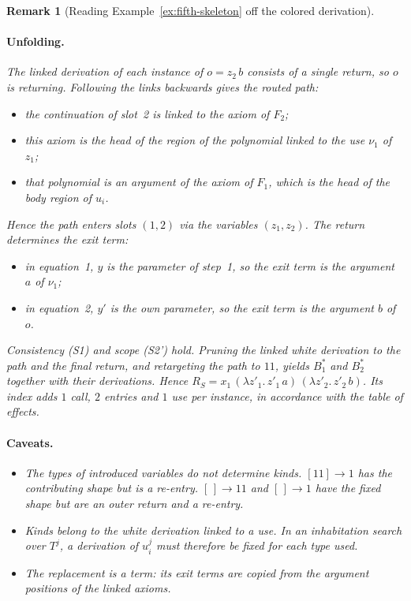 \documentclass[10pt,a4paper]{article}
\theoremstyle{plain}%
\newtheorem{remark}[theorem]{Remark}
\begin{document}
\begin{remark}[Reading Example~\ref{ex:fifth-skeleton} off the colored derivation]
\paragraph{Unfolding.}
The linked derivation of each instance of $o = z_2\,b$ consists of a single return, so $o$ is returning.
Following the links backwards gives the routed path:
\begin{itemize}
\item the continuation of slot~2 is linked to the axiom of $F_2$;
\item this axiom is the head of the region of the polynomial linked to the use $\nu_1$ of $z_1$;
\item that polynomial is an argument of the axiom of $F_1$, which is the head of the body region of $u_i$.
\end{itemize}
Hence the path enters slots $(1,2)$ via the variables $(z_1, z_2)$.
The return determines the exit term:
\begin{itemize}
\item in equation~1, $y$ is the parameter of step~1, so the exit term is the argument $a$ of $\nu_1$;
\item in equation~2, $y'$ is the own parameter, so the exit term is the argument $b$ of $o$.
\end{itemize}
Consistency (S1) and scope (S2') hold.
Pruning the linked white derivation to the path and the final return, and retargeting the path to $11$, yields $B^*_1$ and $B^*_2$ together with their derivations.
Hence $R_S = x_1\,(\lambda z'_1.\,z'_1\,a)\,(\lambda z'_2.\,z'_2\,b)$.
Its index adds $1$ call, $2$ entries and $1$ use per instance, in accordance with the table of effects.

\paragraph{Caveats.}
\begin{itemize}
\item The types of introduced variables do not determine kinds.
$[11] \to 1$ has the contributing shape but is a re-entry.
$[\,] \to 11$ and $[\,] \to 1$ have the fixed shape but are an outer return and a re-entry.
\item Kinds belong to the white derivation linked to a use.
In an inhabitation search over $T^j$, a derivation of $u_i^j$ must therefore be fixed for each type used.
\item The replacement is a term: its exit terms are copied from the argument positions of the linked axioms.
\end{itemize}
\end{remark}
\end{document}
